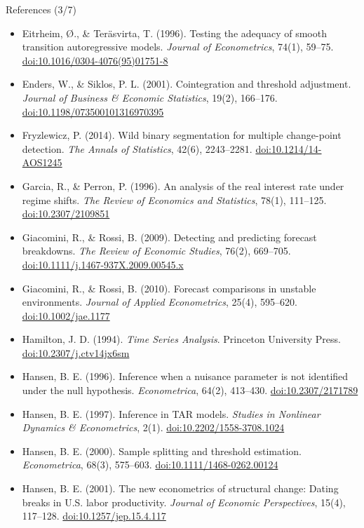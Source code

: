 \begin{frame}{References (3/7)}
\itemsize{\tiny}
\begin{itemize}
    \item Eitrheim, Ø., \& Teräsvirta, T. (1996). Testing the adequacy of smooth transition autoregressive models. \textit{Journal of Econometrics}, 74(1), 59--75. \href{https://doi.org/10.1016/0304-4076(95)01751-8}{doi:10.1016/0304-4076(95)01751-8}
    \item Enders, W., \& Siklos, P. L. (2001). Cointegration and threshold adjustment. \textit{Journal of Business \& Economic Statistics}, 19(2), 166--176. \href{https://doi.org/10.1198/073500101316970395}{doi:10.1198/073500101316970395}
    \item Fryzlewicz, P. (2014). Wild binary segmentation for multiple change-point detection. \textit{The Annals of Statistics}, 42(6), 2243--2281. \href{https://doi.org/10.1214/14-AOS1245}{doi:10.1214/14-AOS1245}
    \item Garcia, R., \& Perron, P. (1996). An analysis of the real interest rate under regime shifts. \textit{The Review of Economics and Statistics}, 78(1), 111--125. \href{https://doi.org/10.2307/2109851}{doi:10.2307/2109851}
    \item Giacomini, R., \& Rossi, B. (2009). Detecting and predicting forecast breakdowns. \textit{The Review of Economic Studies}, 76(2), 669--705. \href{https://doi.org/10.1111/j.1467-937X.2009.00545.x}{doi:10.1111/j.1467-937X.2009.00545.x}
    \item Giacomini, R., \& Rossi, B. (2010). Forecast comparisons in unstable environments. \textit{Journal of Applied Econometrics}, 25(4), 595--620. \href{https://doi.org/10.1002/jae.1177}{doi:10.1002/jae.1177}
    \item Hamilton, J. D. (1994). \textit{Time Series Analysis}. Princeton University Press. \href{https://doi.org/10.2307/j.ctv14jx6sm}{doi:10.2307/j.ctv14jx6sm}
    \item Hansen, B. E. (1996). Inference when a nuisance parameter is not identified under the null hypothesis. \textit{Econometrica}, 64(2), 413--430. \href{https://doi.org/10.2307/2171789}{doi:10.2307/2171789}
    \item Hansen, B. E. (1997). Inference in TAR models. \textit{Studies in Nonlinear Dynamics \& Econometrics}, 2(1). \href{https://doi.org/10.2202/1558-3708.1024}{doi:10.2202/1558-3708.1024}
    \item Hansen, B. E. (2000). Sample splitting and threshold estimation. \textit{Econometrica}, 68(3), 575--603. \href{https://doi.org/10.1111/1468-0262.00124}{doi:10.1111/1468-0262.00124}
    \item Hansen, B. E. (2001). The new econometrics of structural change: Dating breaks in U.S. labor productivity. \textit{Journal of Economic Perspectives}, 15(4), 117--128. \href{https://doi.org/10.1257/jep.15.4.117}{doi:10.1257/jep.15.4.117}
\end{itemize}
\end{frame}

